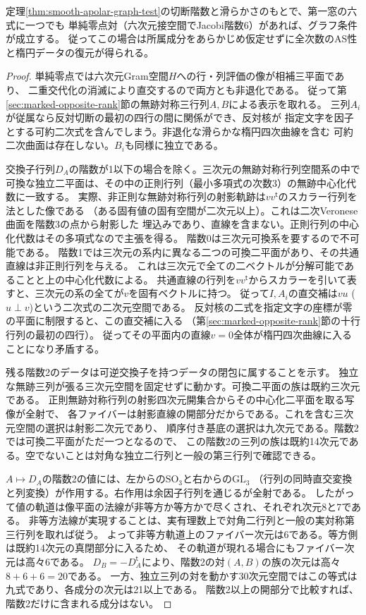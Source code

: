 \begin{theorem}[一つの単純零点からの楕円被覆認識]\label{thm:simple-zero-smooth-elliptic}
定理\ref{thm:smooth-apolar-graph-test}の切断階数と滑らかさのもとで、第一窓の六式に一つでも
単純零点対（六次元接空間でJacobi階数6）があれば、グラフ条件が成立する。
従ってこの場合は所属成分をあらかじめ仮定せずに全次数のAS性と楕円データの復元が得られる。
\end{theorem}
\begin{proof}
単純零点では六次元Gram空間$H$への行・列評価の像が相補三平面であり、
二重交代化の消滅により直交するので両方とも非退化である。
従って第\ref{sec:marked-opposite-rank}節の無跡対称三行列$A,B$による表示を取れる。
三列$A_i$が従属なら反対切断の最初の四行の間に関係ができ、反対核が
指定文字を因子とする可約二次式を含んでしまう。非退化な滑らかな楕円四次曲線を含む
可約二次曲面は存在しない。$B_i$も同様に独立である。

交換子行列$D_A$の階数が1以下の場合を除く。三次元の無跡対称行列空間系の中で
可換な独立二平面は、その中の正則行列（最小多項式の次数3）の無跡中心化代数に一致する。
実際、非正則な無跡対称行列の射影軌跡は$vv^{\mathsf t}$のスカラー行列を法とした像である
（ある固有値の固有空間が二次元以上）。これは二次Veronese曲面を階数3の点から射影した
埋込みであり、直線を含まない。正則行列の中心化代数はその多項式なので主張を得る。
階数0は三次元可換系を要するので不可能である。
階数1では三次元の系内に異なる二つの可換二平面があり、その共通直線は非正則行列を与える。
これは三次元で全ての二ベクトルが分解可能であることと上の中心化代数による。
共通直線の行列を$vv^{\mathsf t}$からスカラーを引いて表すと、三次元の系の全てが$v$を固有ベクトルに持つ。
従って$I,A_i$の直交補は$vu$ ($u\perp v$)という二次式の二次元空間である。
反対核の二式を指定文字の座標が零の平面に制限すると、この直交補に入る
（第\ref{sec:marked-opposite-rank}節の十行行列の最初の四行）。
従ってその平面内の直線$v=0$全体が楕円四次曲線に入ることになり矛盾する。

残る階数2のデータは可逆交換子を持つデータの閉包に属することを示す。
独立な無跡三列が張る三次元空間を固定せずに動かす。可換二平面の族は既約三次元である。
正則無跡対称行列の射影四次元開集合からその中心化二平面を取る写像が全射で、
各ファイバーは射影直線の開部分だからである。これを含む三次元空間の選択は射影二次元であり、
順序付き基底の選択は九次元である。階数2では可換二平面がただ一つとなるので、
この階数2の三列の族は既約14次元である。空でないことは対角な独立二行列と一般の第三行列で確認できる。

$A\mapsto D_A$の階数2の値には、左からの$\mathrm{SO}_3$と右からの$\mathrm{GL}_3$
（行列の同時直交変換と列変換）が作用する。右作用は余因子行列を通じるが全射である。
したがって値の軌道は像平面の法線が非等方か等方かで尽くされ、それぞれ次元8と7である。
非等方法線が実現することは、実有理数上で対角二行列と一般の実対称第三行列を取れば従う。
よって非等方軌道上のファイバー次元は6である。等方側は既約14次元の真閉部分に入るため、
その軌道が現れる場合にもファイバー次元は高々6である。
$D_B=-D_A^{\mathsf t}$により、階数2の対$(A,B)$の族の次元は高々$8+6+6=20$である。
一方、独立三列の対を動かす30次元空間ではこの等式は九式であり、各成分の次元は21以上である。
階数2以上の開部分で比較すれば、階数2だけに含まれる成分はない。


\end{proof}
